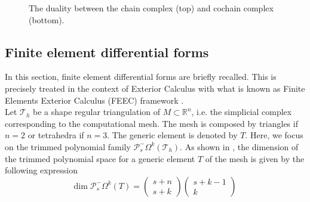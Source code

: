 \documentclass{elsarticle}
\newcommand{\bbR}{\mathbb{R}}
\begin{document}
\begin{figure}[h]
\centering
{} 
\caption{The duality between the chain complex (top) and cochain complex (bottom).}
\label{fig:cd_cochain}
\end{figure}



\subsection{Finite element differential forms}

In this section, finite element differential forms are briefly recalled. This is precisely treated in the context of Exterior Calculus with what is known as Finite Elements Exterior Calculus (FEEC)  framework \cite{arnold2006acta,arnold2018finite}. \\

Let $\mathcal{T}_h$ be a shape regular triangulation of $M \subset \bbR^n$, i.e. the simplicial complex corresponding to the computational mesh. The mesh is composed by triangles if $n=2$ or tetrahedra if $n=3$. The generic element is denoted by $T$. Here, we focus on the trimmed polynomial family $\mathcal{P}^-_s\Omega^k(\mathcal{T}_h)$. As shown in \cite{arnold2006acta}, the dimension of the trimmed polynomial space for a generic element 
$T$ of the mesh is given by the following expression \begin{equation*}
\mathrm{dim}\; \mathcal{P}^-_s\Omega^k(T)=\begin{pmatrix}
s+n \\
s+k
\end{pmatrix}
\begin{pmatrix}
s+k-1 \\
k
\end{pmatrix}
\end{equation*}
\end{document}
